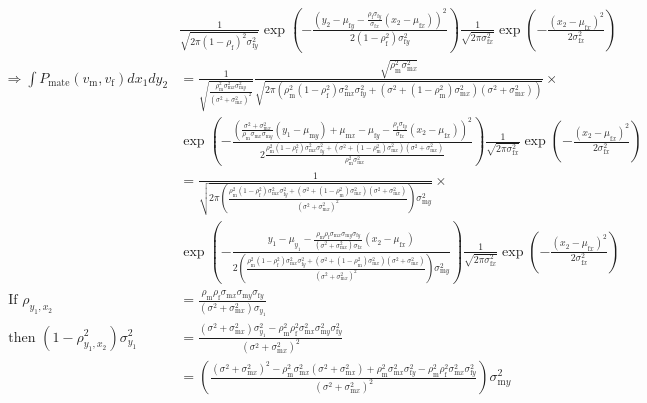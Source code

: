 \documentclass{article}
\newcommand{\x}[1]{\text{#1}}
\begin{document}
\begin{align*}
\\&\frac{1}{\sqrt{2\pi(1-\rho_\x{f})^2\sigma_{\x{f}y}^2}}\exp\left(-\frac{\left(y_2-\mu_{\x{f}y}-\frac{\rho_\x{f}\sigma_{\x{f}y}}{\sigma_{\x{f}x}}(x_2-\mu_{\x{f}x})\right)^2}{2(1-\rho_\x{f}^2)\sigma_{\x{f}y}^2}\right)\frac{1}{\sqrt{2\pi\sigma_{\x{f}x}^2}}\exp\left(-\frac{(x_2-\mu_{\x{f}x})^2}{2\sigma_{\x{f}x}^2}\right)
\\\Rightarrow \int P_\text{mate}(v_\x{m},v_\x{f})dx_1dy_2&=\frac{1}{\sqrt{\frac{\rho_\x{m}^2\sigma_{\x{m}x}^2\sigma_{\x{m}y}^2}{(\sigma^2+\sigma_{\x{m}x}^2)^2}}}\frac{\sqrt{\rho_\x{m}^2\sigma_{\x{m}x}^2}}{\sqrt{2\pi\left(\rho_\x{m}^2(1-\rho_\x{f}^2)\sigma_{\x{m}x}^2\sigma_{\x{f}y}^2+(\sigma^2+(1-\rho_\x{m}^2)\sigma_{\x{m}x}^2)(\sigma^2+\sigma_{\x{m}x}^2)\right)}}\times
\\&\exp\left(-\frac{\left(\frac{\sigma^2+\sigma_{\x{m}x}^2}{\rho_\x{m}\sigma_{\x{m}x}\sigma_{\x{m}y}}(y_1-\mu_{\x{m}y})+\mu_{\x{m}x}-\mu_{\x{f}y}-\frac{\rho_\x{f}\sigma_{\x{f}y}}{\sigma_{\x{f}x}}(x_2-\mu_{\x{f}x})\right)^2}{2\frac{\rho_\x{m}^2(1-\rho_\x{f}^2)\sigma_{\x{m}x}^2\sigma_{\x{f}y}^2+(\sigma^2+(1-\rho_\x{m}^2)\sigma_{\x{m}x}^2)(\sigma^2+\sigma_{\x{m}x}^2)}{\rho_{\x{m}}^2\sigma_{\x{m}x}^2}}\right)\frac{1}{\sqrt{2\pi\sigma_{\x{f}x}^2}}\exp\left(-\frac{(x_2-\mu_{\x{f}x})^2}{2\sigma_{\x{f}x}^2}\right)
\\&=\frac{1}{\sqrt{2\pi\left(\frac{\rho_\x{m}^2(1-\rho_\x{f}^2)\sigma_{\x{m}x}^2\sigma_{\x{f}y}^2+(\sigma^2+(1-\rho_\x{m}^2)\sigma_{\x{m}x}^2)(\sigma^2+\sigma_{\x{m}x}^2)}{(\sigma^2+\sigma_{\x{m}x}^2)^2}\right)\sigma_{\x{m}y}^2}}\times
\\&\exp\left(-\frac{y_1-\mu_{y_1}-\frac{\rho_\x{m}\rho_\x{f}\sigma_{\x{m}x}\sigma_{\x{m}y}\sigma_{\x{f}y}}{(\sigma^2+\sigma_{\x{m}x}^2)\sigma_{\x{f}x}}(x_2-\mu_{\x{f}x})}{2\left(\frac{\rho_\x{m}^2(1-\rho_\x{f}^2)\sigma_{\x{m}x}^2\sigma_{\x{f}y}^2+(\sigma^2+(1-\rho_\x{m}^2)\sigma_{\x{m}x}^2)(\sigma^2+\sigma_{\x{m}x}^2)}{(\sigma^2+\sigma_{\x{m}x}^2)^2}\right)\sigma_{\x{m}y}^2}\right)\frac{1}{\sqrt{2\pi\sigma_{\x{f}x}^2}}\exp\left(-\frac{(x_2-\mu_{\x{f}x})^2}{2\sigma_{\x{f}x}^2}\right)
\\ \text{ If } \rho_{y_1,x_2}&=\frac{\rho_\x{m}\rho_\x{f}\sigma_{\x{m}x}\sigma_{\x{m}y}\sigma_{\x{f}y}}{(\sigma^2+\sigma_{\x{m}x}^2)\sigma_{y_1}}
\\ \text{ then } (1-\rho_{y_1,x_2}^2)\sigma_{y_1}^2&=\frac{(\sigma^2+\sigma_{\x{m}x}^2)\sigma_{y_1}^2-\rho_\x{m}^2\rho_\x{f}^2\sigma_{\x{m}x}^2\sigma_{\x{m}y}^2\sigma_{\x{f}y}^2}{(\sigma^2+\sigma_{\x{m}x}^2)^2}
\\&=\left(\frac{(\sigma^2+\sigma_{\x{m}x}^2)^2-\rho_\x{m}^2\sigma_{\x{m}x}^2(\sigma^2+\sigma_{\x{m}x}^2)+\rho_\x{m}^2\sigma_{\x{m}x}^2\sigma_{\x{f}y}^2-\rho_\x{m}^2\rho_\x{f}^2\sigma_{\x{m}x}^2\sigma_{\x{f}y}^2}{(\sigma^2+\sigma_{\x{m}x}^2)^2}\right)\sigma_{\x{m}y}^2

\end{align*}
\end{document}
